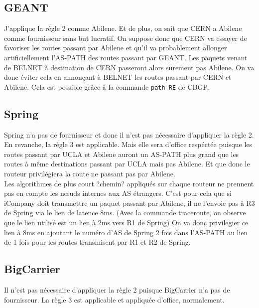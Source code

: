 \documentclass[a4paper, 12pt]{article}
\begin{document}
\subsection{GEANT}
J'applique la règle 2 comme Abilene.
Et de plus, on sait que CERN a Abilene comme fournisseur sans but lucratif. %
On suppose donc que CERN va essayer de favoriser les routes passant par Abilene et qu'il va probablement allonger artificiellement l'AS-PATH des routes passant par GEANT.
Les paquets venant de BELNET à destination de CERN passeront alors surement pas Abilene.
On va donc éviter cela en annonçant à BELNET les routes passant par CERN et Abilene.
Cela est possible grâce à la commande \texttt{path RE} de CBGP.

\subsection{Spring}
Spring n'a pas de fournisseur et donc il n'est pas nécessaire d'appliquer la règle 2.
\\

En revanche, la règle 3 est applicable.
Mais elle sera d'office respéctée puisque les routes passant par UCLA et Abilene auront un AS-PATH plus grand que les routes à même destinations passant par UCLA mais pas Abilene.
Et que donc le routeur privilégiera la route ne passant pas par Abilene.
\\

Les algorithmes de plus court ?chemin? appliqués sur chaque routeur ne prennent pas en compte les nœuds internes aux AS étrangers.
C'est pour cela que si iCompany doit transmettre un paquet passant par Abilene, il ne l'envoie pas à R3 de Spring via le lien de latence 8ms.
(Avec la commande traceroute, on observe que le lien utilisé est un lien à 2ms vers R1 de Spring)
On va donc privilegier ce lien à 8ms en ajoutant le numéro d'AS de Spring 2 fois dans l'AS-PATH au lien de 1 fois pour les routes transmisent par R1 et R2 de Spring.

\subsection{BigCarrier}
Il n'est pas nécessaire d'appliquer la règle 2 puisque BigCarrier n'a pas de fournisseur.
La règle 3 est applicable et appliquée d'office, normalement.
\end{document}
